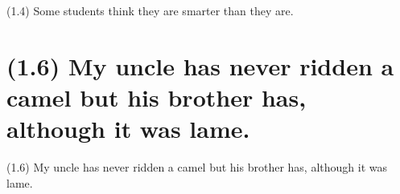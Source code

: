 \documentclass{article}
\begin{document}
\bigbreak
\begin{enumerate*}
\item[(1.4)] Some students think they are smarter than they are.
\end{enumerate*}
\bigbreak

\bigbreak
\begin{minipage}{\textwidth}
\end{minipage}
\bigbreak

\clearpage

%
%

\section*{(1.6) My uncle has never ridden a camel but his brother has, although it was lame.}

\bigbreak
\begin{enumerate*}
\item[(1.6)] My uncle has never ridden a camel but his brother has, although it was lame.
\end{enumerate*}
\bigbreak
\end{document}
